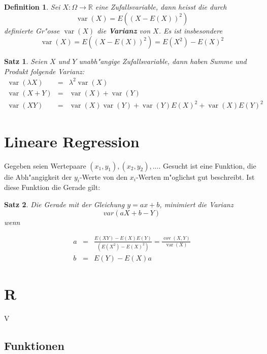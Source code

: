 \documentclass[ngerman, a4paper, 10pt, twocolumn, DIV20, headings=small]{scrartcl}
\newtheorem{definition}{Definition}
\newtheorem{satz}{Satz}
\begin{document}
\begin{definition}
Sei $X\colon\Omega\to\mathbb{R}$ eine Zufallsvariable, dann
heisst die durch 
\[
\operatorname{var}(X)=E((X-E(X))^2)
\]
 definierte Gr"osse $\operatorname{var}(X)$ die
{\bf Varianz} von $X$. Es ist insbesondere
\[
\operatorname{var}(X)=E((X-E(X))^2)=E(X^2)-E(X)^2
\]
\end{definition}

\begin{satz}
\label{rechenregeln-varianz}
Seien $X$ und $Y$ unabh"angige Zufallsvariable, dann haben
Summe und Produkt folgende Varianz:
\begin{eqnarray*}
\operatorname{var}(\lambda X)&=&\lambda^2\operatorname{var}(X)\\
\operatorname{var}(X+Y)&=&\operatorname{var}(X)+\operatorname{var}(Y)\\
\operatorname{var}(XY)&=&\operatorname{var}(X)\operatorname{var}(Y)
+
\operatorname{var}(Y)E(X)^2+\operatorname{var}(X)E(Y)^2
\end{eqnarray*}
\end{satz}

\section{Lineare Regression}
\label{sec:lineareregression}

Gegeben seien Wertepaare $(x_1, y_1), (x_2, y_2), ...$. Gesucht ist eine Funktion, die die Abh"angigkeit der $y_i$-Werte von den $x_i$-Werten m"oglichst gut beschreibt. Ist diese Funktion die Gerade gilt:
\begin{satz}
  Die Gerade mit der Gleichung $y = ax + b$, minimiert die Varianz
\[
var(aX + b - Y)
\]
wenn

\begin{eqnarray*}
a&=&\frac{E(XY)-E(X)E(Y)}{(E(X^2)-E(X)^2)}=\frac{\operatorname{cov}(X,Y)}{\operatorname{var}(X)}\\
b&=&E(Y)-E(X)a
\end{eqnarray*}

\end{satz}

\section{R}
\label{sec:r}

V

\subsection{Funktionen}
\label{sec:r-funktionen}
\end{document}
